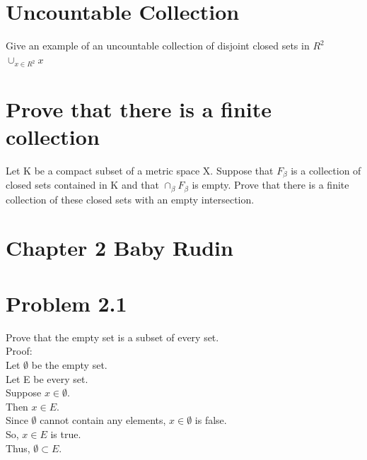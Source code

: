 \section{Uncountable Collection}
Give an example of an uncountable collection of disjoint closed sets in $R^2$ \\ 
$\cup_{x \in R^2} x$
\section{Prove that there is a finite collection}
Let K be a compact subset of a metric space X. Suppose that $F_{\beta}$ is a collection of closed sets contained in K and that $\cap_{\beta} F_{\beta}$ is empty. Prove that there is a finite collection of these closed sets with an empty intersection. 



\section{Chapter 2 Baby Rudin}


\section{Problem 2.1}
Prove that the empty set is a subset of every set. 
\\
Proof:\\ 
Let $\emptyset$ be the empty set. \\ 
Let E be every set. \\ 
Suppose $x \in \emptyset.$ \\ 
Then $x \in E.$ \\ 
Since $\emptyset$ cannot contain any elements, $x \in \emptyset$ is false. \\ 
So, $x \in E$ is true. \\ 
Thus, $\emptyset \subset E.$
\\

\begin{figure}[h]\end{figure} 
\newpage
